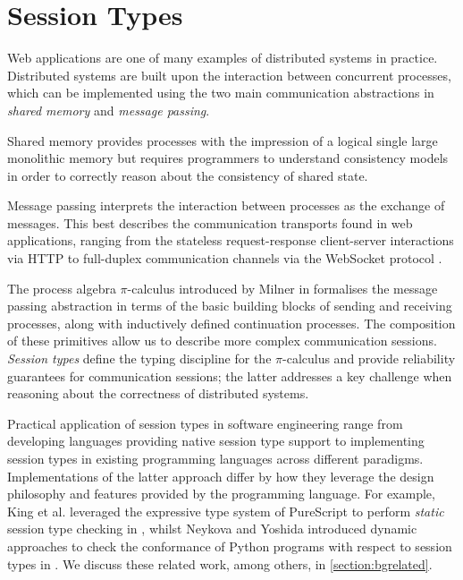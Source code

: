 \section{Session Types}

Web applications are one of many examples of 
distributed systems in practice. 
Distributed systems are built upon the interaction 
between concurrent processes, which can be implemented using 
the two main communication abstractions in 
\textit{shared memory} and \textit{message passing}. 

Shared memory provides processes with the impression of 
a logical single large monolithic memory 
but requires programmers to understand consistency models 
in order to correctly reason about the consistency of shared state.

Message passing interprets the interaction between processes 
as the exchange of messages.
This best describes the communication transports 
found in web applications, ranging from the 
stateless request-response client-server interactions via HTTP 
to full-duplex communication channels via the WebSocket protocol 
\cite{WebSocketRFC}.

The process algebra $\pi$-calculus 
introduced by Milner in \cite{Milner1999} 
formalises the message passing abstraction in terms of 
the basic building blocks of sending and receiving processes,
along with inductively defined continuation processes. 
The composition of these primitives allow us to 
describe more complex communication sessions.
\textit{Session types} define the typing discipline 
for the $\pi$-calculus and provide reliability guarantees 
for communication sessions; 
the latter addresses a key challenge when 
reasoning about the correctness of distributed systems. 

Practical application of session types in software
engineering range from
developing languages providing native session type support 
\cite{ATS2016} to implementing session types 
in existing programming languages across different paradigms.
Implementations of the latter approach differ by 
how they leverage the design philosophy and features 
provided by the programming language.
For example, King et al. leveraged the 
expressive type system of PureScript to perform 
\textit{static} session type checking in \cite{PureScript2019},
whilst Neykova and Yoshida introduced dynamic approaches to 
check the conformance of Python programs 
with respect to session types in \cite{Python2017}.
We discuss these related work, among others, in \cref{section:bgrelated}.

